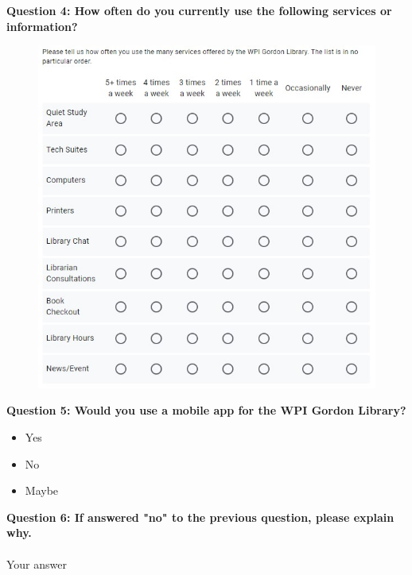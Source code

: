 \noindent\textbf{Question 4: How often do you currently use the following services or information?}
\begin{figure}[H]
    \centering
     \includegraphics[width = \textwidth, height = \textheight, keepaspectratio]{assets/img/Initial Survey Q4.jpg}
\end{figure}
\newline


\noindent\textbf{Question 5: Would you use a mobile app for the WPI Gordon Library?}
\begin{itemize}
    \item Yes
    \item No
    \item Maybe
\end{itemize}
\newline


\noindent\textbf{Question 6: If answered "no" to the previous question, please explain why.}
\paragraph{}
Your answer
\newline


